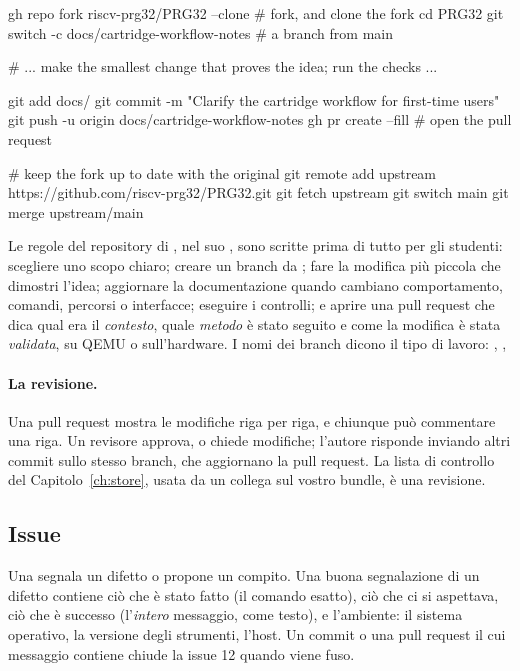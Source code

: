 \begin{shell}[caption={Un contributo a \prg, dal fork alla pull request.},label=lst:git:pr]
gh repo fork riscv-prg32/PRG32 --clone       # fork, and clone the fork
cd PRG32
git switch -c docs/cartridge-workflow-notes  # a branch from main

# ... make the smallest change that proves the idea; run the checks ...

git add docs/
git commit -m "Clarify the cartridge workflow for first-time users"
git push -u origin docs/cartridge-workflow-notes
gh pr create --fill                          # open the pull request

# keep the fork up to date with the original
git remote add upstream https://github.com/riscv-prg32/PRG32.git
git fetch upstream
git switch main
git merge upstream/main
\end{shell}

Le regole del repository di \prg, nel suo , sono
scritte prima di tutto per gli studenti: scegliere uno scopo chiaro; creare un
branch da ; fare la modifica più piccola che dimostri l'idea;
aggiornare la documentazione quando cambiano comportamento, comandi, percorsi o
interfacce; eseguire i controlli; e aprire una pull request che dica qual era
il \emph{contesto}, quale \emph{metodo} è stato seguito e come la modifica è
stata \emph{validata}, su QEMU o sull'hardware. I nomi dei branch dicono il
tipo di lavoro: , , 

\paragraph{La revisione.} Una pull request mostra le modifiche riga per riga,
e chiunque può commentare una riga. Un revisore approva, o chiede modifiche;
l'autore risponde inviando altri commit sullo stesso branch, che aggiornano la
pull request. La lista di controllo del Capitolo~\ref{ch:store}, usata da un
collega sul vostro bundle, è una revisione.

\subsection{Issue}

Una  segnala un difetto o propone un compito. Una buona
segnalazione di un difetto contiene ciò che è stato fatto (il comando esatto),
ciò che ci si aspettava, ciò che è successo (l'\emph{intero} messaggio, come
testo), e l'ambiente: il sistema operativo, la versione degli strumenti,
l'host. Un commit o una pull request il cui messaggio contiene
 chiude la issue 12 quando viene fuso.

